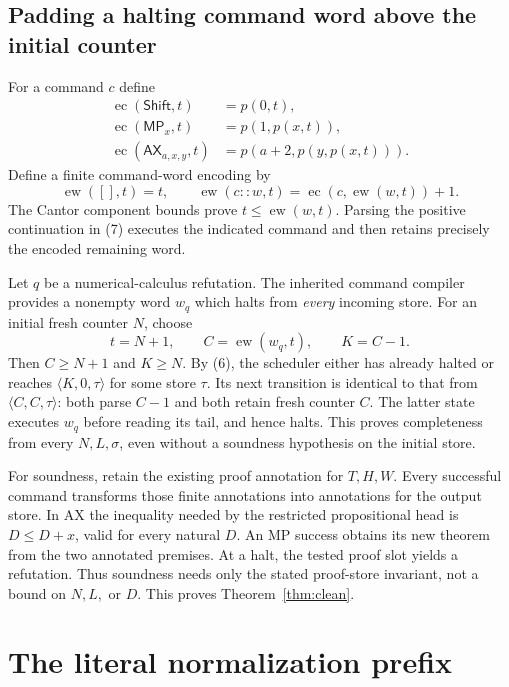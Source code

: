 \documentclass[11pt]{article}
\begin{document}
\subsection{Padding a halting command word above the initial counter}

For a command $c$ define
\[
\begin{aligned}
 \operatorname{ec}(\mathsf{Shift},t)&=p(0,t),\\
 \operatorname{ec}(\mathsf{MP}_x,t)&=p(1,p(x,t)),\\
 \operatorname{ec}(\mathsf{AX}_{a,x,y},t)
      &=p(a+2,p(y,p(x,t))).
\end{aligned}
\]
Define a finite command-word encoding by
\[
 \operatorname{ew}([],t)=t,\qquad
 \operatorname{ew}(c::w,t)=\operatorname{ec}(c,\operatorname{ew}(w,t))+1.
\tag{7}
\]
The Cantor component bounds prove $t\le\operatorname{ew}(w,t)$.
Parsing the positive continuation in (7) executes the indicated command
and then retains precisely the encoded remaining word.

Let $q$ be a numerical-calculus refutation. The inherited command compiler
provides a nonempty word $w_q$ which halts from \emph{every} incoming store.
For an initial fresh counter $N$, choose
\[
       t=N+1,\qquad C=\operatorname{ew}(w_q,t),\qquad K=C-1.
\tag{8}
\]
Then $C\ge N+1$ and $K\ge N$. By (6), the scheduler either has already
halted or reaches $\langle K,0,\tau\rangle$ for some store $\tau$.
Its next transition is identical to that from
$\langle C,C,\tau\rangle$: both parse $C-1$ and both retain fresh counter
$C$. The latter state executes $w_q$ before reading its tail, and hence
halts. This proves completeness from every $N,L,\sigma$, even without a
soundness hypothesis on the initial store.

For soundness, retain the existing proof annotation for $T,H,W$.
Every successful command transforms those finite annotations into
annotations for the output store. In AX the inequality needed by the
restricted propositional head is $D\le D+x$, valid for every natural $D$.
An MP success obtains its new theorem from the two annotated premises.
At a halt, the tested proof slot yields a refutation. Thus soundness needs
only the stated proof-store invariant, not a bound on $N,L,$ or $D$.
This proves Theorem~\ref{thm:clean}.

\section{The literal normalization prefix}
\end{document}
